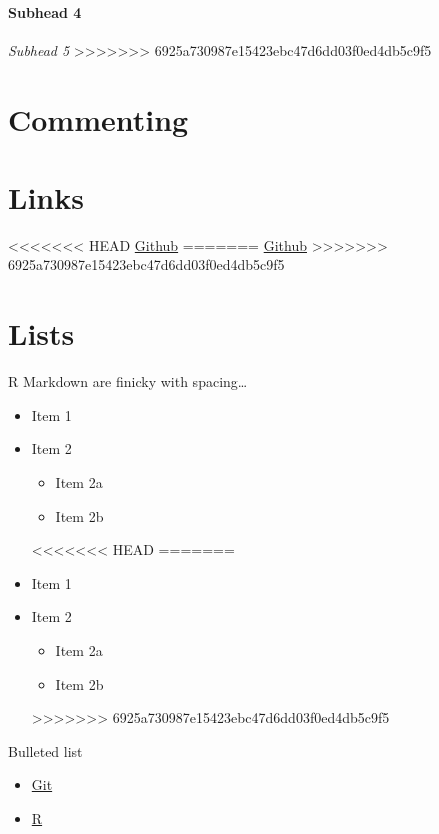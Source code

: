 \documentclass[12pt,]{article}
\providecommand{\tightlist}{%
  \setlength{\itemsep}{0pt}\setlength{\parskip}{0pt}}
\let\oldparagraph\paragraph
\renewcommand{\paragraph}[1]{\oldparagraph{#1}\mbox{}}
\begin{document}
\paragraph{Subhead 4}\label{subhead-4}

\emph{Subhead 5}
>>>>>>> 6925a730987e15423ebc47d6dd03f0ed4db5c9f5

\section{Commenting}\label{commenting}

\section{Links}\label{links}

<<<<<<< HEAD
\href{http://www.github.com}{Github}
=======
\href{www.github.com}{Github}
>>>>>>> 6925a730987e15423ebc47d6dd03f0ed4db5c9f5

\section{Lists}\label{lists}

R Markdown are finicky with spacing\ldots{}

\begin{itemize}
\tightlist
\item
  Item 1
\item
  Item 2

  \begin{itemize}
  \tightlist
  \item
    Item 2a
  \item
    Item 2b
  \end{itemize}
<<<<<<< HEAD
=======
\item
  Item 1
\item
  Item 2

  \begin{itemize}
  \tightlist
  \item
    Item 2a
  \item
    Item 2b
  \end{itemize}
>>>>>>> 6925a730987e15423ebc47d6dd03f0ed4db5c9f5
\end{itemize}

Bulleted list

\begin{itemize}[noitemsep,nolistsep,topsep=0pt]

\item \href{https://git-scm.com/book/en/v2/Getting-Started-Installing-Git}{Git}

\item \href{https://cran.r-project.org/bin/windows/base/}{R}

\end{itemize}
\end{document}
